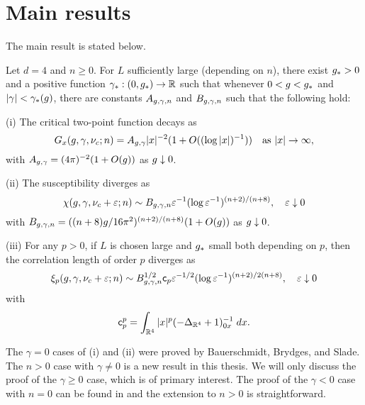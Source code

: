 \section{Main results}

The main result is stated below.

\begin{theorem}
\label{thm:mr}
Let $d = 4$ and $n \ge 0$. For $L$ sufficiently large (depending on $n$),
there exist $g_* > 0$
and a positive function $\gamma_* : (0, g_*) \rightarrow {\mathbb R}$
such that whenever $0 < g < g_*$ and $|\gamma| < \gamma_*(g)$,
there are constants $A_{g,\gamma,n}$ and $B_{g,\gamma,n}$ such that the following hold:

\smallskip\noindent
(i)
The critical two-point function decays as
\begin{equation}
G_x(g,\gamma,\nu_c; n)
    =
A_{g,\gamma} |x|^{-2} (1 + O((\log |x|)^{-1}))
    \quad
\text{as $|x|\rightarrow\infty$},
\end{equation}
with $A_{g,\gamma} = (4 \pi)^{-2} (1 + O(g))$ as $g \downarrow 0$.

\smallskip\noindent
(ii)
The susceptibility diverges as
\begin{equation} \label{e:chieps-asympt}
\chi(g, \gamma, \nu_c + \varepsilon; n)
	\sim
B_{g,\gamma,n} \varepsilon^{-1} (\log \varepsilon^{-1})^{(n+2)/(n+8)},
	\quad
\varepsilon\downarrow 0
\end{equation}
with $B_{g,\gamma,n} = ((n + 8) g / 16\pi^2)^{(n+2)/(n+8)} (1 + O(g))$
as $g \downarrow 0$.

\smallskip\noindent
(iii)
For any $p >0$, if $L$ is chosen large and $g_*$ small both depending on $p$,
then the correlation length of order $p$ diverges as
\begin{equation} \label{e:xieps-asympt}
\xi_p(g, \gamma, \nu_c + \varepsilon; n)
	\sim
B_{g,\gamma,n}^{1/2} {\sf c}_p \varepsilon^{-1/2} (\log \varepsilon^{-1})^{(n+2)/2(n+8)},
	\quad
\varepsilon\downarrow 0
\end{equation}
with
\begin{equation}
\label{e:cpdef}
{\sf c}_p^p
	=
\int_{{\mathbb R}^4} |x|^p (-\Delta_{{\mathbb R}^4} + 1)^{-1}_{0x} \; dx.
\end{equation}
\end{theorem}

The $\gamma = 0$ cases of (i) and (ii) were proved by Bauerschmidt, Brydges, and
Slade. The $n > 0$ case with $\gamma \ne 0$ is a new result in this thesis. We
will only discuss the proof of the $\gamma \ge 0$ case, which is of primary
interest. The proof of the $\gamma < 0$ case with $n = 0$ can be found in
\cite{BSW-saw-sa} and the extension to $n > 0$ is straightforward.